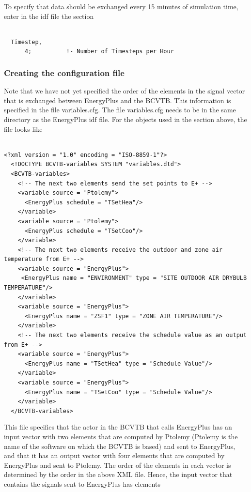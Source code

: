 To specify that data should be exchanged every 15 minutes of simulation time, enter in the idf file the section

\begin{lstlisting}

  Timestep,
      4;          !- Number of Timesteps per Hour
\end{lstlisting}

\subsubsection{Creating the configuration file}\label{creating-the-configuration-file}

Note that we have not yet specified the order of the elements in the signal vector that is exchanged between EnergyPlus and the BCVTB. This information is specified in the file variables.cfg. The file variables.cfg needs to be in the same directory as the EnergyPlus idf file. For the objects used in the section above, the file looks like

\begin{lstlisting}

<?xml version = "1.0" encoding = "ISO-8859-1"?>
  <!DOCTYPE BCVTB-variables SYSTEM "variables.dtd">
  <BCVTB-variables>
    <!-- The next two elements send the set points to E+ -->
    <variable source = "Ptolemy">
      <EnergyPlus schedule = "TSetHea"/>
    </variable>
    <variable source = "Ptolemy">
      <EnergyPlus schedule = "TSetCoo"/>
    </variable>
    <!-- The next two elements receive the outdoor and zone air temperature from E+ -->
    <variable source = "EnergyPlus">
     <EnergyPlus name = "ENVIRONMENT" type = "SITE OUTDOOR AIR DRYBULB TEMPERATURE"/>
    </variable>
    <variable source = "EnergyPlus">
      <EnergyPlus name = "ZSF1" type = "ZONE AIR TEMPERATURE"/>
    </variable>
    <!-- The next two elements receive the schedule value as an output from E+ -->
    <variable source = "EnergyPlus">
      <EnergyPlus name = "TSetHea" type = "Schedule Value"/>
    </variable>
    <variable source = "EnergyPlus">
      <EnergyPlus name = "TSetCoo" type = "Schedule Value"/>
    </variable>
  </BCVTB-variables>
\end{lstlisting}

This file specifies that the actor in the BCVTB that calls EnergyPlus has an input vector with two elements that are computed by Ptolemy (Ptolemy is the name of the software on which the BCVTB is based) and sent to EnergyPlus, and that it has an output vector with four elements that are computed by EnergyPlus and sent to Ptolemy. The order of the elements in each vector is determined by the order in the above XML file. Hence, the input vector that contains the signals sent to EnergyPlus has elements

